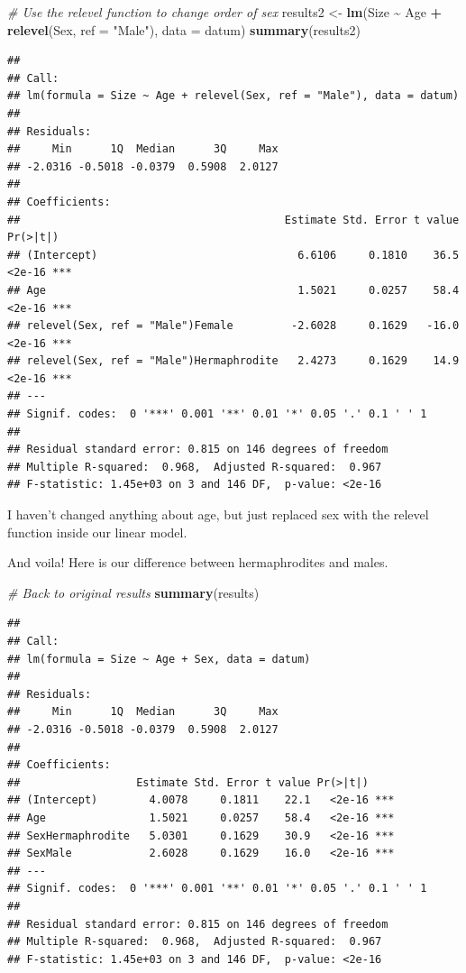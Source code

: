 \documentclass[
]{article}
\newenvironment{Shaded}{\begin{snugshade}}{\end{snugshade}}
\newcommand{\AttributeTok}[1]{\textcolor[rgb]{0.13,0.29,0.53}{#1}}
\newcommand{\CommentTok}[1]{\textcolor[rgb]{0.56,0.35,0.01}{\textit{#1}}}
\newcommand{\FunctionTok}[1]{\textcolor[rgb]{0.13,0.29,0.53}{\textbf{#1}}}
\newcommand{\NormalTok}[1]{#1}
\newcommand{\OtherTok}[1]{\textcolor[rgb]{0.56,0.35,0.01}{#1}}
\newcommand{\SpecialCharTok}[1]{\textcolor[rgb]{0.81,0.36,0.00}{\textbf{#1}}}
\newcommand{\StringTok}[1]{\textcolor[rgb]{0.31,0.60,0.02}{#1}}
\begin{document}
\begin{Shaded}
\begin{Highlighting}[]
\CommentTok{\# Use the relevel function to change order of sex}
\NormalTok{results2 }\OtherTok{\textless{}{-}} \FunctionTok{lm}\NormalTok{(Size }\SpecialCharTok{\textasciitilde{}}\NormalTok{ Age }\SpecialCharTok{+} \FunctionTok{relevel}\NormalTok{(Sex, }\AttributeTok{ref =} \StringTok{"Male"}\NormalTok{), }\AttributeTok{data =}\NormalTok{ datum)}
\FunctionTok{summary}\NormalTok{(results2)}
\end{Highlighting}
\end{Shaded}

\begin{verbatim}
## 
## Call:
## lm(formula = Size ~ Age + relevel(Sex, ref = "Male"), data = datum)
## 
## Residuals:
##     Min      1Q  Median      3Q     Max 
## -2.0316 -0.5018 -0.0379  0.5908  2.0127 
## 
## Coefficients:
##                                         Estimate Std. Error t value Pr(>|t|)    
## (Intercept)                               6.6106     0.1810    36.5   <2e-16 ***
## Age                                       1.5021     0.0257    58.4   <2e-16 ***
## relevel(Sex, ref = "Male")Female         -2.6028     0.1629   -16.0   <2e-16 ***
## relevel(Sex, ref = "Male")Hermaphrodite   2.4273     0.1629    14.9   <2e-16 ***
## ---
## Signif. codes:  0 '***' 0.001 '**' 0.01 '*' 0.05 '.' 0.1 ' ' 1
## 
## Residual standard error: 0.815 on 146 degrees of freedom
## Multiple R-squared:  0.968,  Adjusted R-squared:  0.967 
## F-statistic: 1.45e+03 on 3 and 146 DF,  p-value: <2e-16
\end{verbatim}

I haven't changed anything about age, but just replaced sex with the
relevel function inside our linear model.

And voila! Here is our difference between hermaphrodites and males.

\begin{Shaded}
\begin{Highlighting}[]
\CommentTok{\# Back to original results}
\FunctionTok{summary}\NormalTok{(results)}
\end{Highlighting}
\end{Shaded}

\begin{verbatim}
## 
## Call:
## lm(formula = Size ~ Age + Sex, data = datum)
## 
## Residuals:
##     Min      1Q  Median      3Q     Max 
## -2.0316 -0.5018 -0.0379  0.5908  2.0127 
## 
## Coefficients:
##                  Estimate Std. Error t value Pr(>|t|)    
## (Intercept)        4.0078     0.1811    22.1   <2e-16 ***
## Age                1.5021     0.0257    58.4   <2e-16 ***
## SexHermaphrodite   5.0301     0.1629    30.9   <2e-16 ***
## SexMale            2.6028     0.1629    16.0   <2e-16 ***
## ---
## Signif. codes:  0 '***' 0.001 '**' 0.01 '*' 0.05 '.' 0.1 ' ' 1
## 
## Residual standard error: 0.815 on 146 degrees of freedom
## Multiple R-squared:  0.968,  Adjusted R-squared:  0.967 
## F-statistic: 1.45e+03 on 3 and 146 DF,  p-value: <2e-16
\end{verbatim}
\end{document}
